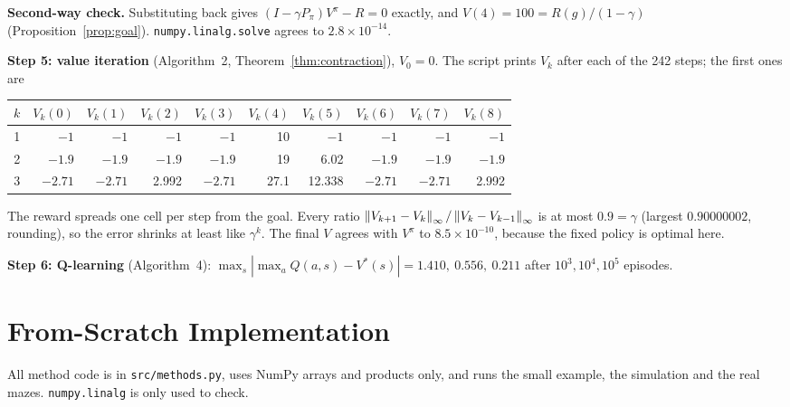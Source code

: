 \noindent\textbf{Second-way check.} Substituting back gives $(I-\gamma P_\pi)V^\pi-R = 0$ exactly, and $V(4) = 100 = R(g)/(1-\gamma)$ (Proposition~\ref{prop:goal}). \texttt{numpy.linalg.solve} agrees to $2.8\times10^{-14}$.

\noindent\textbf{Step 5: value iteration} (Algorithm~2, Theorem~\ref{thm:contraction}), $V_0 = 0$. The script prints $V_k$ after each of the 242 steps; the first ones are
\begin{center}
\small
\begin{tabular}{rrrrrrrrrr}
\toprule
$k$ & $V_k(0)$ & $V_k(1)$ & $V_k(2)$ & $V_k(3)$ & $V_k(4)$ & $V_k(5)$ & $V_k(6)$ & $V_k(7)$ & $V_k(8)$\\
\midrule
1 & $-1$ & $-1$ & $-1$ & $-1$ & 10 & $-1$ & $-1$ & $-1$ & $-1$\\
2 & $-1.9$ & $-1.9$ & $-1.9$ & $-1.9$ & 19 & 6.02 & $-1.9$ & $-1.9$ & $-1.9$\\
3 & $-2.71$ & $-2.71$ & 2.992 & $-2.71$ & 27.1 & 12.338 & $-2.71$ & $-2.71$ & 2.992\\
\bottomrule
\end{tabular}
\end{center}
The reward spreads one cell per step from the goal. Every ratio $\left\lVert V_{k+1}-V_k\right\rVert_\infty/\left\lVert V_k-V_{k-1}\right\rVert_\infty$ is at most $0.9 = \gamma$ (largest $0.90000002$, rounding), so the error shrinks at least like $\gamma^k$. The final $V$ agrees with $V^\pi$ to $8.5\times10^{-10}$, because the fixed policy is optimal here.

\noindent\textbf{Step 6: Q-learning} (Algorithm~4): $\max_s|\max_aQ(a,s)-V^*(s)| = 1.410,\ 0.556,\ 0.211$ after $10^3, 10^4, 10^5$ episodes.

\section{From-Scratch Implementation}

All method code is in \texttt{src/methods.py}, uses NumPy arrays and products only, and runs the small example, the simulation and the real mazes. \texttt{numpy.linalg} is only used to check.


